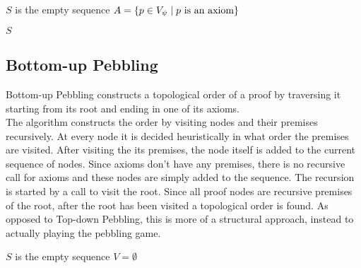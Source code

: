 \documentclass{llncs}
\begin{document}
\begin{algorithm}[h]
	
	$S$ is the empty sequence\;
	$A = \{p \in V_{\psi} \mid p \text{ is an axiom}\}$\;
	
	
	\Return $S$\;
	
  \caption[.]{}
  \label{algo:TDpebbling}
\end{algorithm}

\subsection{Bottom-up Pebbling}

Bottom-up Pebbling constructs a topological order of a proof by traversing it starting from its root and ending in one of its axioms.\\
The algorithm constructs the order by visiting nodes and their premises recursively. 
At every node it is decided heuristically in what order the premises are visited.
After visiting the its premises, the node itself is added to the current sequence of nodes.
Since axioms don't have any premises, there is no recursive call for axioms and these nodes are simply added to the sequence.
The recursion is started by a call to visit the root.
Since all proof nodes are recursive premises of the root, after the root has been visited a topological order is found.
As opposed to Top-down Pebbling, this is more of a structural approach, instead to actually playing the pebbling game.


\begin{algorithm}[h]
  \BlankLine

	$S$ is the empty sequence\;
	$V = \emptyset$\;
	\Return {}\;

  \caption[.]{}
  \label{algo:BUpebbling}
\end{algorithm}
\end{document}
